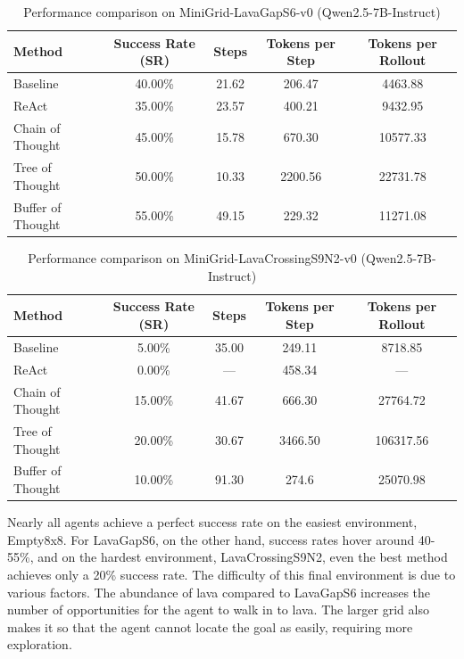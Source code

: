 \begin{table}[h!]
\centering
\caption{Performance comparison on MiniGrid-LavaGapS6-v0 (Qwen2.5-7B-Instruct)}
\label{tab:lavagap}
\begin{tabular}{lcccc}
\toprule
Method & Success Rate (SR) & Steps & Tokens per Step & Tokens per Rollout\\
\midrule
Baseline           & 40.00\% & 21.62 & 206.47 & 4463.88\\
ReAct              & 35.00\% & 23.57 & 400.21 & 9432.95\\
Chain of Thought   & 45.00\% & 15.78 & 670.30 & 10577.33\\
Tree of Thought    & 50.00\% & 10.33 & 2200.56 & 22731.78\\
Buffer of Thought  & 55.00\% & 49.15 & 229.32 & 11271.08\\
\bottomrule
\end{tabular}
\end{table}

\begin{table}[h!]
\centering
\caption{Performance comparison on MiniGrid-LavaCrossingS9N2-v0 (Qwen2.5-7B-Instruct)}
\label{tab:lavacrossing}
\begin{tabular}{lcccc}
\toprule
Method & Success Rate (SR) & Steps & Tokens per Step & Tokens per Rollout\\
\midrule
Baseline           &  5.00\% & 35.00  & 249.11 & 8718.85\\
ReAct              &  0.00\% & ---    & 458.34 & ---\\
Chain of Thought   & 15.00\% & 41.67  & 666.30 & 27764.72\\
Tree of Thought    & 20.00\% & 30.67  & 3466.50 & 106317.56\\
Buffer of Thought  & 10.00\% & 91.30  & 274.6 & 25070.98\\
\bottomrule
\end{tabular}
\end{table}

Nearly all agents achieve a perfect success rate on the easiest environment, Empty8x8. For LavaGapS6, on the other hand, success rates hover around 40-55\%, and on the hardest environment, LavaCrossingS9N2, even the best method achieves only a 20\% success rate. The difficulty of this final environment is due to various factors. The abundance of lava compared to LavaGapS6 increases the number of opportunities for the agent to walk in to lava. The larger grid also makes it so that the agent cannot locate the goal as easily, requiring more exploration. 

